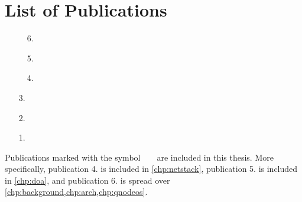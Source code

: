 \chapter*{List of Publications}

\def\ticon{{\footnotesize \faFileTextO}}

\begin{enumerate}[label={\ticon~~\arabic*.},itemsep=\baselineskip]
    \item[\ticon~~6.] 
    \item[\ticon~~5.] 
    \item[\ticon~~4.] 
    \item[3.] 
    \item[2.] 
    \item[1.] 
\end{enumerate}

\vspace{2\baselineskip}
\noindent
Publications marked with the symbol~~\ticon~~are included in this thesis. More specifically,
publication 4. is included in \cref{chp:netstack}, publication 5. is included in \cref{chp:doa}, and
publication 6. is spread over \cref{chp:background,chp:arch,chp:qnodeos}.

\printbibliography[heading=subbibintoc,title={References},notcategory=noprint]
